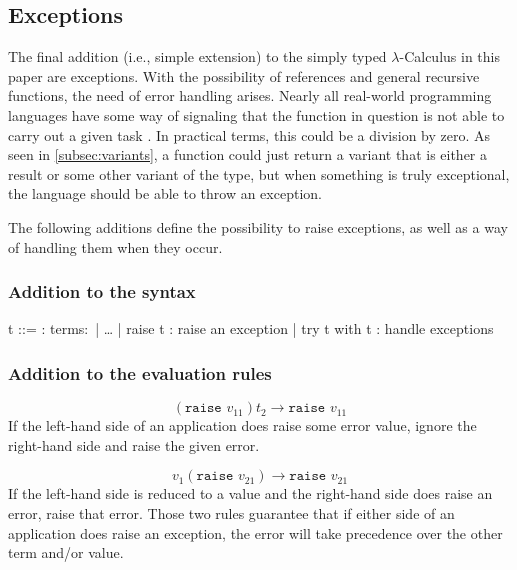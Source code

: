 \subsection{Exceptions}

The final addition (i.e., simple extension) to the
simply typed $\lambda$-Calculus in this paper are exceptions. With the possibility
of references and general recursive functions, the need of
error handling arises. Nearly all real-world programming languages
have some way of signaling that the function in question is not able
to carry out a given task \cite{pierce2002ProgLang}. In practical terms,
this could be a division by zero. As seen in \ref{subsec:variants},
a function could just return a variant that is either a result or
some other variant of the type, but when something is truly exceptional,
the language should be able to throw an exception.

The following additions define the possibility to raise exceptions,
as well as a way of handling them when they occur.

\subsubsection{Addition to the syntax \cite{pierce2002ProgLang}}
\begin{bnfgrammar}
    t ::= : terms$\colon$
    | \dots
    | raise t : raise an exception
    | try t with t : handle exceptions
\end{bnfgrammar}\leavevmode\newline

\subsubsection{Addition to the evaluation rules \cite{pierce2002ProgLang}}
\begin{equation*}
    \tag{Application Raise 1}
    (\texttt{raise } v_{11}) t_2 \rightarrow \texttt{raise } v_{11}
\end{equation*}
If the left-hand side of an application does raise some error value,
ignore the right-hand side and raise the given error.

\begin{equation*}
    \tag{Application Raise 2}
    v_1 (\texttt{raise } v_{21}) \rightarrow \texttt{raise } v_{21}
\end{equation*}
If the left-hand side is reduced to a value and the right-hand side does
raise an error, raise that error. Those two rules guarantee that 
if either side of an application does raise an exception,
the error will take precedence over the other term and/or value.

